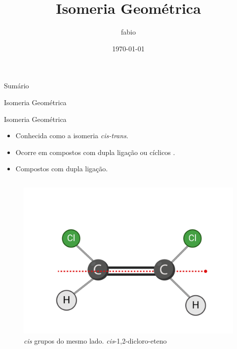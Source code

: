 \documentclass{beamer}
\author{fabio}
\date{\today}
\title{Isomeria Geométrica}
\begin{document}
\begingroup
  \maketitle
  \endgroup
\begin{frame}{Sumário}
\tableofcontents
\end{frame}


\begin{frame}[label={sec:orge237f00}]{Isomeria Geométrica}
\begin{block}{Isomeria Geométrica}
\begin{itemize}
\item Conhecida como a isomeria \emph{cis-trans}.
\item Ocorre em compostos com dupla ligação ou cíclicos .
\item Compostos com dupla ligação.
\end{itemize}


\begin{columns}
\begin{column}{0.4\columnwidth}
\begin{figure}[htbp]
\centering
\includegraphics[width=.9\linewidth]{./CIS.png}
\caption{\emph{cis} grupos do mesmo lado. \emph{cis}-1,2-dicloro-eteno}
\end{figure}
\end{column}


\end{columns}
\end{block}
\end{frame}
\end{document}
